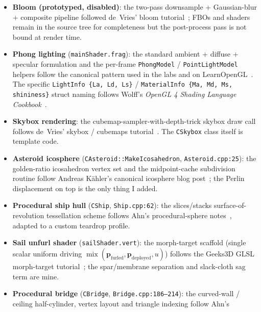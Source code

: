 \documentclass[11pt,a4paper]{article}
\begin{document}
\begin{itemize}
  \item \textbf{Bloom (prototyped, disabled)}: the two-pass downsample +
        Gaussian-blur + composite pipeline followed de~Vries' bloom
        tutorial~\cite{learnopengl_fbo_postprocess}; FBOs and shaders
        remain in the source tree for completeness but the post-process
        pass is not bound at render time.
  \item \textbf{Phong lighting} (\texttt{mainShader.frag}): the standard
        ambient + diffuse + specular formulation and the per-frame
        \texttt{PhongModel} / \texttt{PointLightModel} helpers follow the
        canonical pattern used in the labs and on
        LearnOpenGL~\cite{learnopengl_basiclighting,learnopengl_multiplelights}.
        The specific \texttt{LightInfo \{La, Ld, Ls\}} /
        \texttt{MaterialInfo \{Ma, Md, Ms, shininess\}} struct naming
        follows Wolff's \emph{OpenGL 4 Shading Language
        Cookbook}~\cite{wolff_cookbook}.
  \item \textbf{Skybox rendering}: the cubemap-sampler-with-depth-trick
        skybox draw call follows de~Vries' skybox / cubemaps
        tutorial~\cite{learnopengl_skybox}. The \texttt{CSkybox} class
        itself is template code.
  \item \textbf{Asteroid icosphere} (\texttt{CAsteroid::MakeIcosahedron},
        \texttt{Asteroid.cpp:25}): the golden-ratio icosahedron vertex set
        and the midpoint-cache subdivision routine follow Andreas K\"ahler's
        canonical icosphere blog post~\cite{kahler_icosphere}; the Perlin
        displacement on top is the only thing I added.
  \item \textbf{Procedural ship hull} (\texttt{CShip},
        \texttt{Ship.cpp:62}): the slices/stacks surface-of-revolution
        tessellation scheme follows Ahn's procedural-sphere
        notes~\cite{songho_sphere}, adapted to a custom teardrop profile.
  \item \textbf{Sail unfurl shader} (\texttt{sailShader.vert}): the
        morph-target scaffold (single scalar uniform driving
        $\operatorname{mix}(\mathbf{p}_\mathrm{furled},
        \mathbf{p}_\mathrm{deployed}, u)$) follows the Geeks3D GLSL
        morph-target tutorial~\cite{geeks3d_morphtarget}; the spar/membrane
        separation and slack-cloth sag term are mine.
  \item \textbf{Procedural bridge} (\texttt{CBridge},
        \texttt{Bridge.cpp:186--214}): the curved-wall / ceiling
        half-cylinder, vertex layout and triangle indexing follow Ahn's

\end{itemize}
\end{document}
